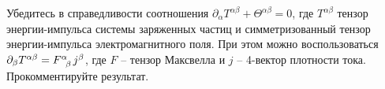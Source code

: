 \documentclass[__main__.tex]{subfiles}
\begin{document}
Убедитесь в справедливости соотношения $\partial_{\alpha}T^{\alpha\beta}+\Theta^{\alpha\beta}=0$, где $T^{\alpha\beta}$ тензор энергии-импульса системы заряженных частиц и симметризованный тензор энергии-импульса электромагнитного поля. При этом можно воспользоваться $\partial_{\beta}T^{\alpha\beta}=F\indices{^\alpha_\beta}j^\beta$, где $F$ -- тензор Максвелла и $j$ -- 4-вектор плотности тока. Прокомментируйте результат.\\ 

\end{document}
